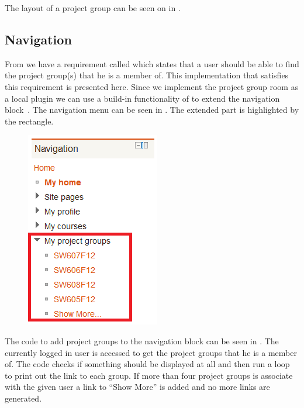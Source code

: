 The layout of a project group \viewroom[] can be seen on  in .





\subsection{Navigation}
From  we have a requirement called  which states that a user should be able to find the project group(s) that he is a member of.
This implementation that satisfies this requirement is presented here.
Since we implement the project group room as a local plugin we can use a build-in functionality of \moodle{} to extend the navigation block~\cite{moodleextendnavigationblock}.
The navigation menu can be seen in .
The extended part is highlighted by the rectangle. 

\begin{figure}
	\centering
		\includegraphics[scale=0.7]{images/moodlenavigationblock.png}
	\label{fig:moodlenavigationblock}
\end{figure}

The code to add project groups to the navigation block can be seen in .
The currently logged in user is accessed to get the project groups that he is a member of.
The code checks if something should be displayed at all and then run a loop to print out the link to each group. 
If more than four project groups is associate with the given user a link to ``Show More'' is added and no more links are generated.


